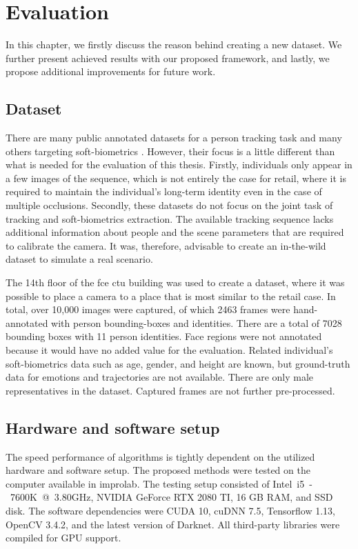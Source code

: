 \chapter{Evaluation}
In this chapter, we firstly discuss the reason behind creating a new dataset. We further present achieved results with our proposed framework, and lastly, we propose additional improvements for future work.

\section{Dataset}
    There are many public annotated datasets \cite{MOTChallenge2015, ferryman2009pets2009, zhuvisdrone2018} for a person tracking task and many others targeting soft-biometrics \cite{goodfellow2013challenges, yang2016wider}. However, their focus is a little different than what is needed for the evaluation of this thesis. Firstly, individuals only appear in a few images of the sequence, which is not entirely the case for retail, where it is required to maintain the individual's long-term identity even in the case of multiple occlusions. Secondly, these datasets do not focus on the joint task of tracking and soft-biometrics extraction. The available tracking sequence lacks additional information about people and the scene parameters that are required to calibrate the camera. It was, therefore, advisable to create an in-the-wild dataset to simulate a real scenario.
    
    The 14th floor of the \gls{fce} \gls{ctu} building was used to create a dataset, where it was possible to place a camera to a place that is most similar to the retail case. In total, over 10,000 images were captured, of which 2463 frames were hand-annotated with person bounding-boxes and identities. There are a total of 7028 bounding boxes with 11 person identities. Face regions were not annotated because it would have no added value for the evaluation. Related individual's soft-biometrics data such as age, gender, and height are known, but ground-truth data for emotions and trajectories are not available. There are only male representatives in the dataset. Captured frames are not further pre-processed.
  
\section{Hardware and software setup}\label{evaluation_estup}
    The speed performance of algorithms is tightly dependent on the utilized hardware and software setup. The proposed methods were tested on the computer available in \gls{improlab}. The testing setup consisted of Intel~i5~-~7600K~@~3.80GHz, NVIDIA GeForce RTX 2080 TI, 16 GB RAM, and SSD disk. The software dependencies were CUDA 10, cuDNN 7.5, Tensorflow 1.13, OpenCV 3.4.2, and the latest version of Darknet. All third-party libraries were compiled for GPU support.

